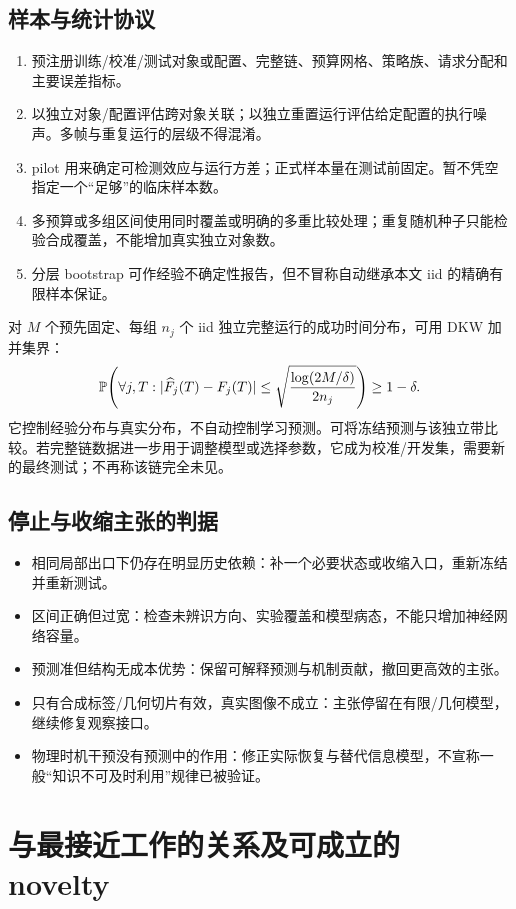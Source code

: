 \documentclass[11pt,a4paper,fontset=fandol]{ctexart}
\theoremstyle{definition}\newtheorem{definition}[theorem]{定义}
\theoremstyle{remark}\newtheorem{remark}[theorem]{说明}
\numberwithin{equation}{section}
\begin{document}
\subsection{样本与统计协议}
\begin{enumerate}
\item 预注册训练/校准/测试对象或配置、完整链、预算网格、策略族、请求分配和主要误差指标。
\item 以独立对象/配置评估跨对象关联；以独立重置运行评估给定配置的执行噪声。多帧与重复运行的层级不得混淆。
\item pilot 用来确定可检测效应与运行方差；正式样本量在测试前固定。暂不凭空指定一个“足够”的临床样本数。
\item 多预算或多组区间使用同时覆盖或明确的多重比较处理；重复随机种子只能检验合成覆盖，不能增加真实独立对象数。
\item 分层 bootstrap 可作经验不确定性报告，但不冒称自动继承本文 iid 的精确有限样本保证。
\end{enumerate}

对 $M$ 个预先固定、每组 $n_j$ 个 iid 独立完整运行的成功时间分布，可用 DKW 加并集界：
\begin{equation}
 \mathbb P\!\left(\forall j,T:
 |\widehat F_j(T)-F_j(T)|\le
 \sqrt{\frac{\log(2M/\delta)}{2n_j}}\right)\ge1-\delta.
 \label{eq:dkw}
\end{equation}
它控制经验分布与真实分布，不自动控制学习预测。可将冻结预测与该独立带比较。若完整链数据进一步用于调整模型或选择参数，它成为校准/开发集，需要新的最终测试；不再称该链完全未见。

\subsection{停止与收缩主张的判据}
\begin{itemize}
\item 相同局部出口下仍存在明显历史依赖：补一个必要状态或收缩入口，重新冻结并重新测试。
\item 区间正确但过宽：检查未辨识方向、实验覆盖和模型病态，不能只增加神经网络容量。
\item 预测准但结构无成本优势：保留可解释预测与机制贡献，撤回更高效的主张。
\item 只有合成标签/几何切片有效，真实图像不成立：主张停留在有限/几何模型，继续修复观察接口。
\item 物理时机干预没有预测中的作用：修正实际恢复与替代信息模型，不宣称一般“知识不可及时利用”规律已被验证。
\end{itemize}

\section{与最接近工作的关系及可成立的 novelty}
\label{sec:novelty}
\end{document}
